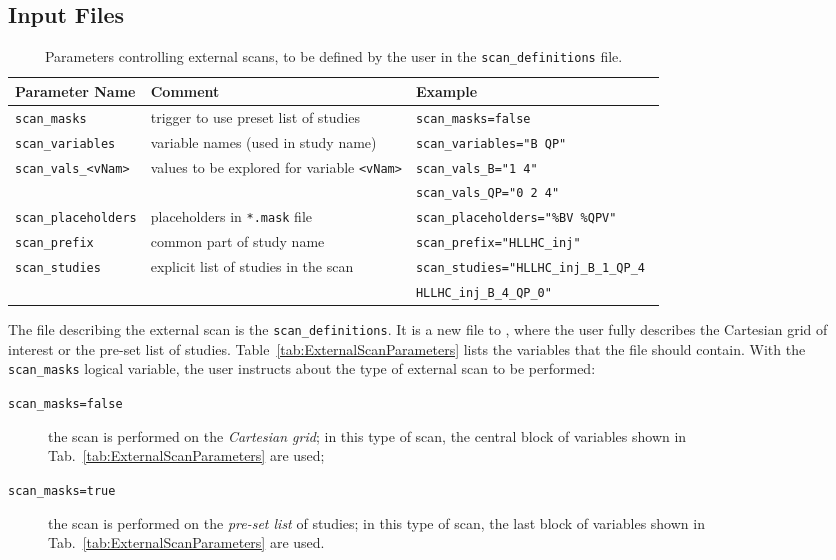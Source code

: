 \subsection{Input Files}
\begin{table}[h]
\begin{center}
  \caption{Parameters controlling external scans, to be defined by
    the user in the \texttt{scan\_definitions} file.}
    \label{tab:ExternalScanParametersCartesian}
    \begin{tabular}{|l|l|l|}
    \hline
    \rowcolor{blue!30}
    \textbf{Parameter Name} & \textbf{Comment} & \textbf{Example} \\
    \hline
    \texttt{scan\_masks} & trigger to use preset list of studies &
       \texttt{scan\_masks=false} \\
    \hline
    \texttt{scan\_variables} & variable names (used in study name) &
       \texttt{scan\_variables="B QP"} \\
    \texttt{scan\_vals\_<vNam>} & values to be explored for variable \texttt{<vNam>} &
    \texttt{scan\_vals\_B="1 4"} \\
    & & \texttt{scan\_vals\_QP="0 2 4"} \\
    \texttt{scan\_placeholders} & placeholders in \texttt{*.mask} file &
       \texttt{scan\_placeholders="\%BV  \%QPV"} \\
    \texttt{scan\_prefix} & common part of study name &
       \texttt{scan\_prefix="HLLHC\_inj"} \\
    \hline
    \texttt{scan\_studies} & explicit list of studies in the scan &
    \texttt{scan\_studies="HLLHC\_inj\_B\_1\_QP\_4  } \\
    & & \texttt{HLLHC\_inj\_B\_4\_QP\_0"} \\
    \hline
    \end{tabular}
\end{center}
\end{table}
The file describing the external scan is the \texttt{scan\_definitions}.
It is a new file to \SIXDESK{}, where the user fully describes the Cartesian
grid of interest or the pre-set list of studies.
Table~\ref{tab:ExternalScanParameters}
lists the variables that the file should contain.
With the \texttt{scan\_masks} logical variable, the user instructs
\SIXDESK{} about the type of external scan to be performed:
\begin{description}
\item[\texttt{scan\_masks=false}] the scan is performed on the
  \emph{Cartesian grid}; in this type of scan, the central
  block of variables shown in Tab.~\ref{tab:ExternalScanParameters}
  are used;
\item[\texttt{scan\_masks=true}] the scan is performed on the
  \emph{pre-set list} of studies; in this type of scan, the last
  block of variables shown in Tab.~\ref{tab:ExternalScanParameters}
  are used.
\end{description}

